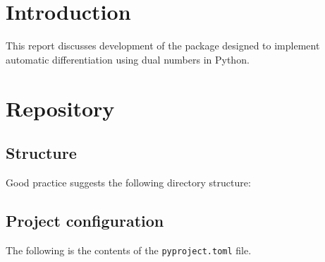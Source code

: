 \documentclass[11pt,a4paper]{article}
\begin{document}

\section{Introduction}
This report discusses development of the package designed to implement automatic differentiation using dual numbers in Python. 

\section{Repository}
\subsection{Structure}
Good practice suggests the following directory structure:


\subsection{Project configuration}
The following is the contents of the \texttt{pyproject.toml} file.

\end{document}
